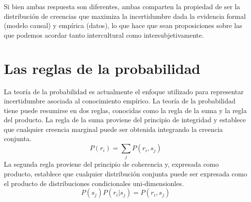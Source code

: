 \documentclass[a4paper,10pt]{book}
\theoremstyle{definition}
\begin{document}
%  
Si bien ambas respuesta son diferentes, ambas comparten la propiedad de ser la distribución de creencias que maximiza la incertidumbre dada la evidencia formal (modelo causal) y empírica (datos), lo que hace que sean proposiciones sobre las que podemos acordar tanto intercultural como intersubjetivamente.


\section{Las reglas de la probabilidad}\label{sec:reglas_de_la_probabilidad}

La teoría de la probabilidad es actualmente el enfoque utilizado para representar incertidumbre asociada al conocimiento empírico.
%
La teoría de la probabilidad tiene puede resumirse en dos reglas, conocidas como la regla de la suma y la regla del producto.
%
La regla de la suma proviene del principio de integridad y establece que cualquier creencia marginal puede ser obtenida integrando la creencia conjunta.
%
\begin{equation}
P(r_i) = \sum_j P(r_i, s_j)
\end{equation}
%
La segunda regla proviene del principio de coherencia y, expresada como producto, establece que cualquier distribución conjunta puede ser expresada como el producto de distribuciones condicionales uni-dimensionles.
%
\begin{equation}
P(s_j)P(r_i|s_j) = P(r_i, s_j)
\end{equation}

\end{document}
